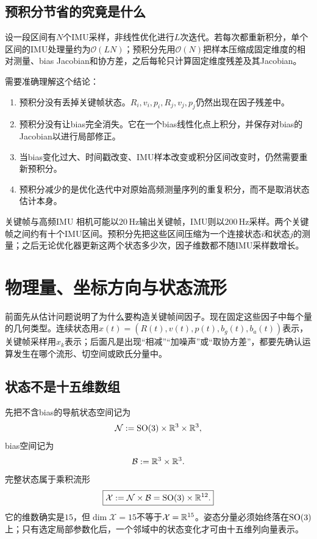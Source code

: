 \subsection{预积分节省的究竟是什么}

设一段区间有$N$个IMU采样，非线性优化进行$L$次迭代。若每次都重新积分，单个区间的IMU处理量约为$\mathcal O(LN)$；预积分先用$\mathcal O(N)$把样本压缩成固定维度的相对测量、bias Jacobian和协方差，之后每轮只计算固定维度残差及其Jacobian。

需要准确理解这个结论：
\begin{enumerate}
    \item 预积分没有丢掉关键帧状态。$R_i,v_i,p_i,R_j,v_j,p_j$仍然出现在因子残差中。
    \item 预积分没有让bias完全消失。它在一个bias线性化点上积分，并保存对bias的Jacobian以进行局部修正。
    \item 当bias变化过大、时间戳改变、IMU样本改变或积分区间改变时，仍然需要重新预积分。
    \item 预积分减少的是优化迭代中对原始高频测量序列的重复积分，而不是取消状态估计本身。
\end{enumerate}

\begin{imucase}{关键帧与高频IMU}
相机可能以$20\,\mathrm{Hz}$输出关键帧，IMU则以$200\,\mathrm{Hz}$采样。两个关键帧之间约有十个IMU区间。预积分先把这些区间压缩为一个连接状态$i$和状态$j$的测量；之后无论优化器更新这两个状态多少次，因子维数都不随IMU采样数增长。
\end{imucase}


\section{物理量、坐标方向与状态流形}

前面先从估计问题说明了为什么要构造关键帧间因子。现在固定这些因子中每个量的几何类型。连续状态用$x(t)=(R(t),v(t),p(t),b_g(t),b_a(t))$表示，关键帧采样用$x_k$表示；后面凡是出现“相减”“加噪声”或“取协方差”，都要先确认运算发生在哪个流形、切空间或欧氏分量中。

\subsection{状态不是十五维数组}

先把不含bias的导航状态空间记为
\[
    \mathcal N
    :=\operatorname{SO}(3)\times\mathbb{R}^3\times\mathbb{R}^3,
\]
bias空间记为
\[
    \mathcal B:=\mathbb{R}^3\times\mathbb{R}^3.
\]
完整状态属于乘积流形
\[
\boxed{
    \mathcal X
    :=\mathcal N\times\mathcal B
    =\operatorname{SO}(3)\times\mathbb{R}^{12}.
}
\]
它的维数确实是$15$，但$\dim\mathcal X=15$不等于$\mathcal X=\mathbb{R}^{15}$。姿态分量必须始终落在$\operatorname{SO}(3)$上；只有选定局部参数化后，一个邻域中的状态变化才可由十五维列向量表示。

